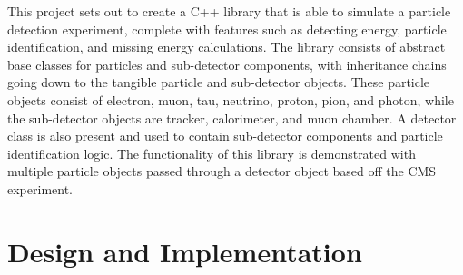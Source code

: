 \documentclass[12pt]{report}
\begin{document}
This project sets out to create a C++ library that is able to simulate a particle detection experiment, complete with features such as detecting energy, particle identification, and missing energy calculations. The library consists of abstract base classes for particles and sub-detector components, with inheritance chains going down to the tangible particle and sub-detector objects. These particle objects consist of electron, muon, tau, neutrino, proton, pion, and photon, while the sub-detector objects are tracker, calorimeter, and muon chamber. A detector class is also present and used to contain sub-detector components and particle identification logic. The functionality of this library is demonstrated with multiple particle objects passed through a detector object based off the CMS experiment.

\section{Design and Implementation}
\end{document}
